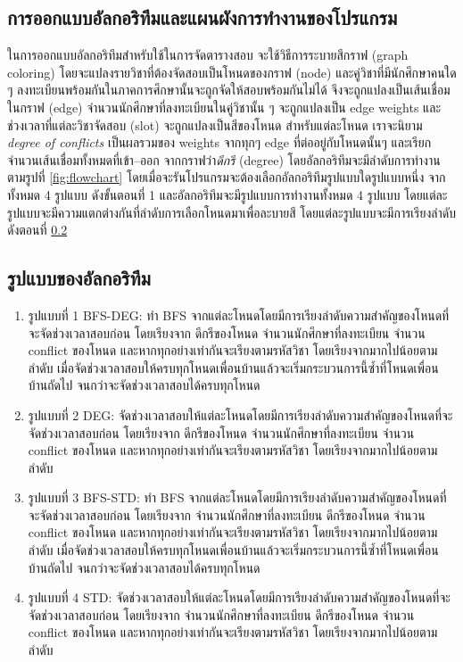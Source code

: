 \subsection{การออกแบบอัลกอริทึมและแผนผังการทำงานของโปรแกรม}
ในการออกแบบอัลกอริทึมสำหรับใช้ในการจัดตารางสอบ จะใช้วิธีการระบายสีกราฟ (graph coloring) 
โดยจะแปลงรายวิชาที่ต้องจัดสอบเป็นโหนดของกราฟ (node) 
และคู่วิชาที่มีนักศึกษาคนใด ๆ ลงทะเบียนพร้อมกันในภาคการศึกษานั้นจะถูกจัดให้สอบพร้อมกันไม่ได้ 
จึงจะถูกแปลงเป็นเส้นเชื่อมในกราฟ (edge) จำนวนนักศึกษาที่ลงทะเบียนในคู่วิชานั้น ๆ จะถูกแปลงเป็น edge weights
และช่วงเวลาที่แต่ละวิชาจัดสอบ (slot) จะถูกแปลงเป็นสีของโหนด
สำหรับแต่ละโหนด เราจะนิยาม \emph{degree of conflicts} เป็นผลรวมของ weights จากทุกๆ edge ที่ต่ออยู่กับโหนดนั้นๆ
และเรียกจำนวนเส้นเชื่อมทั้งหมดที่เข้า--ออก จากกราฟว่า\emph{ดีกรี} (degree) 
โดยอัลกอริทึมจะมีลำดับการทำงานตามรูปที่ \ref{fig:flowchart} 
โดยเมื่อจะรันโปรแกรมจะต้องเลือกอัลกอริทึมรูปแบบใดรูปแบบหนึ่ง จากทั้งหมด 4 รูปแบบ ดังขั้นตอนที่ 1
และอัลกอริทึมจะมีรูปแบบการทำงานทั้งหมด 4 รูปแบบ โดยแต่ละรูปแบบจะมีความแตกต่างกันที่ลำดับการเลือกโหนดมาเพื่อละบายสี
โดยแต่ละรูปแบบจะมีการเรียงลำดับ ดังตอนที่ \ref{subsec:sorting_type}

\subsection{รูปแบบของอัลกอริทึม}
\label{subsec:sorting_type}
\begin{enumerate}
  \item รูปแบบที่ 1 BFS-DEG: ทำ BFS จากแต่ละโหนดโดยมีการเรียงลำดับความสำคัญของโหนดที่จะจัดช่วงเวลาสอบก่อน โดยเรียงจาก
  ดีกรีของโหนด จำนวนนักศึกษาที่ลงทะเบียน จำนวน conflict ของโหนด และหากทุกอย่างเท่ากันจะเรียงตามรหัสวิชา โดยเรียงจากมากไปน้อยตามลำดับ
  เมื่อจัดช่วงเวลาสอบให้ครบทุกโหนดเพื่อนบ้านแล้วจะเริ่มกระบวนการนี้ซ้ำที่โหนดเพื่อนบ้านถัดไป จนกว่าจะจัดช่วงเวลาสอบได้ครบทุกโหนด
  \item รูปแบบที่ 2 DEG: จัดช่วงเวลาสอบให้แต่ละโหนดโดยมีการเรียงลำดับความสำคัญของโหนดที่จะจัดช่วงเวลาสอบก่อน โดยเรียงจาก
  ดีกรีของโหนด จำนวนนักศึกษาที่ลงทะเบียน จำนวน conflict ของโหนด และหากทุกอย่างเท่ากันจะเรียงตามรหัสวิชา โดยเรียงจากมากไปน้อยตามลำดับ
  \item รูปแบบที่ 3 BFS-STD: ทำ BFS จากแต่ละโหนดโดยมีการเรียงลำดับความสำคัญของโหนดที่จะจัดช่วงเวลาสอบก่อน โดยเรียงจาก
  จำนวนนักศึกษาที่ลงทะเบียน ดีกรีของโหนด จำนวน conflict ของโหนด และหากทุกอย่างเท่ากันจะเรียงตามรหัสวิชา โดยเรียงจากมากไปน้อยตามลำดับ
  เมื่อจัดช่วงเวลาสอบให้ครบทุกโหนดเพื่อนบ้านแล้วจะเริ่มกระบวนการนี้ซ้ำที่โหนดเพื่อนบ้านถัดไป จนกว่าจะจัดช่วงเวลาสอบได้ครบทุกโหนด
  \item รูปแบบที่ 4 STD: จัดช่วงเวลาสอบให้แต่ละโหนดโดยมีการเรียงลำดับความสำคัญของโหนดที่จะจัดช่วงเวลาสอบก่อน โดยเรียงจาก
  จำนวนนักศึกษาที่ลงทะเบียน ดีกรีของโหนด จำนวน conflict ของโหนด และหากทุกอย่างเท่ากันจะเรียงตามรหัสวิชา โดยเรียงจากมากไปน้อยตามลำดับ
\end{enumerate}

